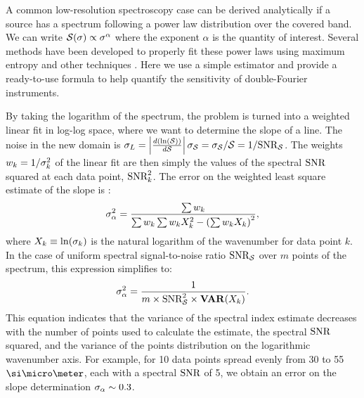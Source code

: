 A common low-resolution spectroscopy case can be derived analytically
if a source has a spectrum following a power law distribution over the covered band. We can 
write $\mathcal{S}(\sigma) \propto \sigma^\alpha$ where the exponent $\alpha$ is the quantity of interest. 
Several methods have been developed to properly fit these power laws using maximum entropy and other 
techniques \citep[e.g.][]{Clauset:2007iy}. Here we use a simple estimator and provide 
a ready-to-use formula to help quantify the sensitivity of double-Fourier instruments.

By taking the logarithm of the spectrum, the problem is turned into a weighted linear fit in log-log space, where we want to determine the slope of a line. The noise in the new domain is $\sigma_L = \left|\frac{d(\ln(\mathcal{S}))}{d\mathcal{S}}\right|\sigma_\mathcal{S} = \sigma_\mathcal{S}/\mathcal{S} = 1/\textrm{SNR}_{\mathcal{S}}$. The weights $w_k = 1/\sigma_k^2$ of the linear fit are then simply the values of the spectral $\textrm{SNR}$ squared at each data point, $\textrm{SNR}^2_k$. The error on the weighted least square estimate of the slope is \citep{Bevington:2003tc}:
\begin{equation}
\sigma_\alpha^2 = \frac{\sum w_k}{\sum w_k\sum w_k X_k^2 - \left(\sum w_k X_k\right)^2},
\end{equation}
where $X_ k \equiv \ln(\sigma_k)$ is the natural logarithm of the wavenumber for data point $k$. In the case of uniform spectral signal-to-noise ratio $\textrm{SNR}_{\mathcal{S}}$ over $m$ points of the spectrum, this expression simplifies to:
\begin{equation}
\sigma_\alpha^2 = \frac{1}{m\times\textrm{SNR}^2_{\mathcal{S}}\times\mathbf{VAR}(X_k)}.
\end{equation}
This equation indicates that the variance of the spectral index estimate decreases with the number of points used to calculate the estimate, the spectral $\textrm{SNR}$ squared, and the variance of the points distribution on the logarithmic wavenumber axis. For example, for 10 data points spread evenly from 30 to 55~$\um$, each with a spectral $\textrm{SNR}$ of 5, we obtain an error on the slope determination $\sigma_\alpha\sim 0.3$.

